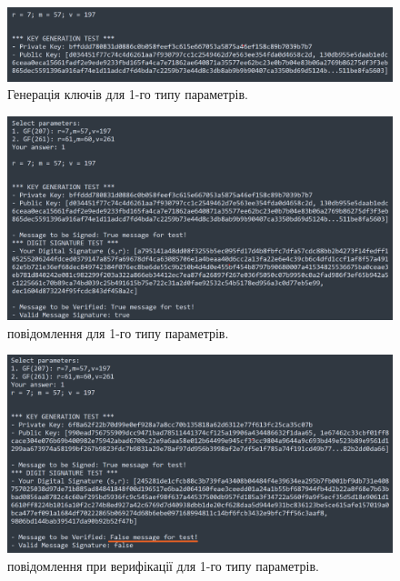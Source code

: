 \begin{figure}[ht]
    \centering
    \includegraphics[scale = 0.6]{IMAGES/key_gen1.png}
    \caption{Генерація ключів для 1-го типу параметрів.}
    \label{fig1}
\end{figure}

\begin{figure}[ht]
    \centering
    \includegraphics[scale = 0.53]{IMAGES/digit_sign_testT1.png}
    \caption{ повідомлення для 1-го типу параметрів.}
    \label{fig1}
\end{figure}
\begin{figure}[ht]
    \centering
    \includegraphics[scale = 0.53]{IMAGES/digit_sign_testF1.png}
    \caption{ повідомлення при верифікації для 1-го типу параметрів.}
    \label{fig1}
\end{figure}

